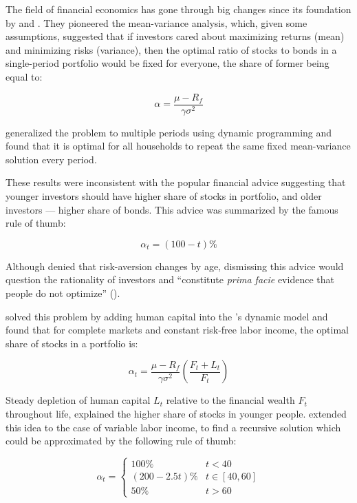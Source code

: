 \documentclass[]{elsarticle}
\begin{document}
The field of financial economics has gone through big changes since its foundation by \citet{markowitz} and \citet{tobin}. They pioneered the mean-variance analysis, which, given some assumptions, suggested that if investors cared about maximizing returns (mean) and minimizing risks (variance), then the optimal ratio of stocks to bonds in a single-period portfolio would be fixed for everyone, the share of former being equal to:

\begin{equation}\label{eq:markowitz}
	\alpha = \frac{\mu - R_f}{\gamma\sigma^2}
\end{equation}

\citet{merton} generalized the problem to multiple periods using dynamic programming and found that it is optimal for all households to repeat the same fixed mean-variance solution every period.

These results were inconsistent with the popular financial advice suggesting that younger investors should have higher share of stocks in portfolio, and older investors --- higher share of bonds. This advice was summarized by the famous rule of thumb:

\begin{equation}\label{eq:stominus}
	\alpha_t = (100 - t)\%
\end{equation}

Although \citet{samuelson} denied that risk-aversion changes by age, dismissing this advice would question the rationality of investors and ``constitute \textit{prima facie} evidence that people do not optimize'' (\citet{canner}).

\citet{bodie} solved this problem by adding human capital into the \citet{merton}'s dynamic model and found that for complete markets and constant risk-free labor income, the optimal share of stocks in a portfolio is:

\begin{equation}\label{eq:bodie}
	\alpha_t = \frac{\mu - R_f}{\gamma \sigma^2} \left( \frac{F_t + L_t}{F_t} \right)
\end{equation}

Steady depletion of human capital $L_t$ relative to the financial wealth $F_t$ throughout life, explained the higher share of stocks in younger people. \citet{cgm} extended this idea to the case of variable labor income, to find a recursive solution which could be approximated by the following rule of thumb:

\begin{equation}\label{eq:cgm}
	\alpha_t =
	\begin{cases}
		100\% 			& 	t<40\\
		(200-2.5t)\% 	& 	t\in[40,60]\\
		50\% 			& 	t>60
	\end{cases}
\end{equation}
\end{document}
